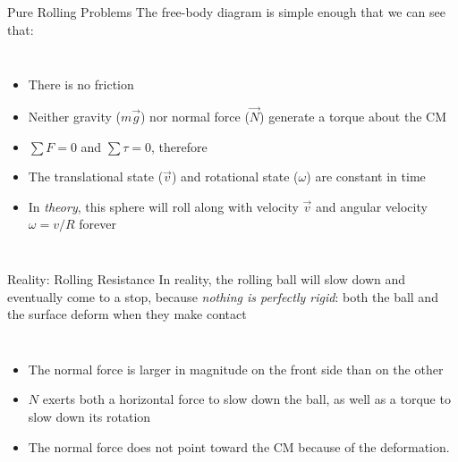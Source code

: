 \documentclass[12pt,compress,aspectratio=169]{beamer}
\begin{document}
\begin{frame}{Pure Rolling Problems}
  The free-body diagram is simple enough that we can see that:
  \begin{columns}
    \begin{itemize}
    \item There is no friction
    \item Neither gravity ($m\vec g$) nor normal force ($\vec N$) generate a
      torque about the CM
    \item $\sum F=0$ and $\sum\tau=0$, therefore
    \item The translational state ($\vec v$) and rotational state ($\omega$) are
      constant in time
    \item In \emph{theory}, this sphere will roll along with velocity $\vec v$
      and angular velocity $\omega=v/R$ forever
    \end{itemize}

  \end{columns}
\end{frame}


\begin{frame}{Reality: Rolling Resistance}
  In reality, the rolling ball will slow down and eventually come to a stop,
  because \emph{nothing is perfectly rigid}: both the ball and the surface
  deform when they make contact
  \begin{columns}
    \begin{itemize}
    \item The normal force is larger in magnitude on the front side than on the
      other
    \item $N$ exerts both a horizontal force to slow down the ball, as well as a
      torque to slow down its rotation
    \item The normal force does not point toward the CM because of the
      deformation.
    \end{itemize}

    \vspace{.3in}
  \end{columns}
\end{frame}
\end{document}
